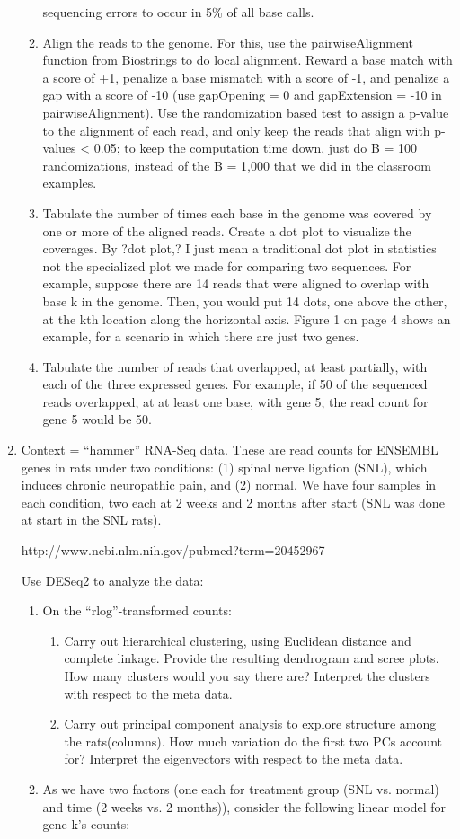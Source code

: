 \documentclass[12pt,a4paper]{paper}
\begin{document}
\begin{enumerate}
\begin{enumerate}
sequencing errors to occur in 5\% of all base calls.
\item Align the reads to the genome. For this, use the pairwiseAlignment function from
Biostrings to do local alignment. Reward a base match with a score of +1, penalize a
base mismatch with a score of -1, and penalize a gap with a score of -10 (use gapOpening
= 0 and gapExtension = -10 in pairwiseAlignment). Use the randomization based test
to assign a p-value to the alignment of each read, and only keep the reads that align with
p-values < 0.05; to keep the computation time down, just do B = 100 randomizations,
instead of the B = 1,000 that we did in the classroom examples.
\item Tabulate the number of times each base in the genome was covered by one or more of
the aligned reads. Create a dot plot to visualize the coverages. By ?dot plot,? I just
mean a traditional dot plot in statistics not the specialized plot we made for comparing
two sequences. For example, suppose there are 14 reads that were aligned to overlap
with base k in the genome. Then, you would put 14 dots, one above the other, at the kth
location along the horizontal axis. Figure 1 on page 4 shows an example, for a scenario
in which there are just two genes.
\item Tabulate the number of reads that overlapped, at least partially, with each of the three
expressed genes. For example, if 50 of the sequenced reads overlapped, at at least one
base, with gene 5, the read count for gene 5 would be 50.
\end{enumerate}
\item Context = “hammer” RNA-Seq data. These are read counts for ENSEMBL genes in rats
under two conditions: (1) spinal nerve ligation (SNL), which induces chronic neuropathic
pain, and (2) normal. We have four samples in each condition, two each at 2 weeks and 2
months after start (SNL was done at start in the SNL rats).
\begin{center}
http://www.ncbi.nlm.nih.gov/pubmed?term=20452967
\end{center}
Use DESeq2 to analyze the data:
\begin{enumerate}
\item On the “rlog”-transformed counts:
\begin{enumerate}
\item Carry out hierarchical clustering, using Euclidean distance and complete linkage.
Provide the resulting dendrogram and scree plots. How many clusters would you
say there are? Interpret the clusters with respect to the meta data.
\item Carry out principal component analysis to explore structure among the rats(columns).
How much variation do the first two PCs account for? Interpret the eigenvectors
with respect to the meta data.
\end{enumerate}
\item As we have two factors (one each for treatment group (SNL vs. normal) and time (2
weeks vs. 2 months)), consider the following linear model for gene k’s counts:
\end{enumerate}
\end{enumerate}
\end{document}
